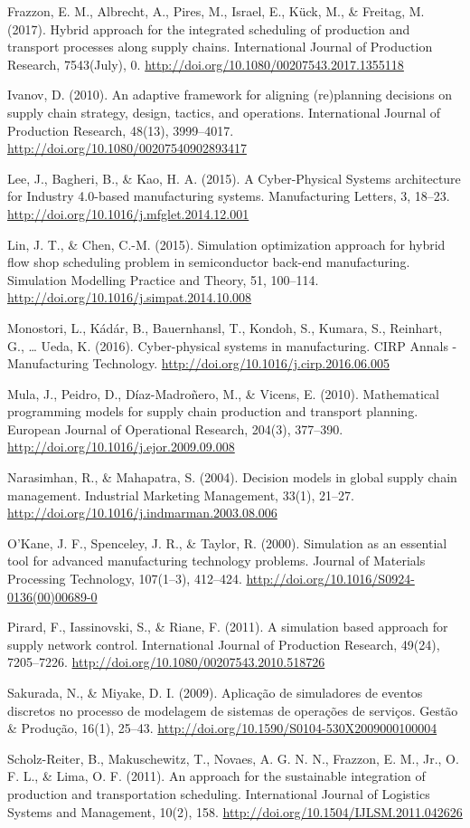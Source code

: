 \documentclass[
]{book}
\begin{document}
Frazzon, E. M., Albrecht, A., Pires, M., Israel, E., Kück, M., \& Freitag, M. (2017). Hybrid approach for the integrated scheduling of production and transport processes along supply chains. International Journal of Production Research, 7543(July), 0. \url{http://doi.org/10.1080/00207543.2017.1355118}

Ivanov, D. (2010). An adaptive framework for aligning (re)planning decisions on supply chain strategy, design, tactics, and operations. International Journal of Production Research, 48(13), 3999--4017. \url{http://doi.org/10.1080/00207540902893417}

Lee, J., Bagheri, B., \& Kao, H. A. (2015). A Cyber-Physical Systems architecture for Industry 4.0-based manufacturing systems. Manufacturing Letters, 3, 18--23. \url{http://doi.org/10.1016/j.mfglet.2014.12.001}

Lin, J. T., \& Chen, C.-M. (2015). Simulation optimization approach for hybrid flow shop scheduling problem in semiconductor back-end manufacturing. Simulation Modelling Practice and Theory, 51, 100--114. \url{http://doi.org/10.1016/j.simpat.2014.10.008}

Monostori, L., Kádár, B., Bauernhansl, T., Kondoh, S., Kumara, S., Reinhart, G., \ldots{} Ueda, K. (2016). Cyber-physical systems in manufacturing. CIRP Annals - Manufacturing Technology. \url{http://doi.org/10.1016/j.cirp.2016.06.005}

Mula, J., Peidro, D., Díaz-Madroñero, M., \& Vicens, E. (2010). Mathematical programming models for supply chain production and transport planning. European Journal of Operational Research, 204(3), 377--390. \url{http://doi.org/10.1016/j.ejor.2009.09.008}

Narasimhan, R., \& Mahapatra, S. (2004). Decision models in global supply chain management. Industrial Marketing Management, 33(1), 21--27. \url{http://doi.org/10.1016/j.indmarman.2003.08.006}

O'Kane, J. F., Spenceley, J. R., \& Taylor, R. (2000). Simulation as an essential tool for advanced manufacturing technology problems. Journal of Materials Processing Technology, 107(1--3), 412--424. \url{http://doi.org/10.1016/S0924-0136(00)00689-0}

Pirard, F., Iassinovski, S., \& Riane, F. (2011). A simulation based approach for supply network control. International Journal of Production Research, 49(24), 7205--7226. \url{http://doi.org/10.1080/00207543.2010.518726}

Sakurada, N., \& Miyake, D. I. (2009). Aplicação de simuladores de eventos discretos no processo de modelagem de sistemas de operações de serviços. Gestão \& Produção, 16(1), 25--43. \url{http://doi.org/10.1590/S0104-530X2009000100004}

Scholz-Reiter, B., Makuschewitz, T., Novaes, A. G. N. N., Frazzon, E. M., Jr., O. F. L., \& Lima, O. F. (2011). An approach for the sustainable integration of production and transportation scheduling. International Journal of Logistics Systems and Management, 10(2), 158. \url{http://doi.org/10.1504/IJLSM.2011.042626}

  
\end{document}

